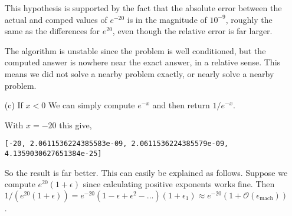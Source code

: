 \documentclass[10pt]{article}
\begin{document}
\begin{solution}[Solution]
\begin{enumerate}
        This hypothesis is supported by the fact that the absolute error between the actual and comped values of \( e^{-20} \) is in the magnitude of \( 10^{-9} \), roughly the same as the differences for \( e^{20} \), even though the relative error is far larger.

        The algorithm is unstable since the problem is well conditioned, but the computed answer is nowhere near the exact answer, in a relative sense. This means we did not solve a nearby problem exactly, or nearly solve a nearby problem. 
        


    \item[(c)]
        If \( x<0 \) We can simply compute \( e^{-x} \) and then return \( 1/e^{-x} \).

        With \( x=-20 \) this give,
        \begin{lstlisting}[basicstyle=\ttfamily\small]
[-20, 2.0611536224385583e-09, 2.0611536224385579e-09, 4.1359030627651384e-25]
        \end{lstlisting}

        So the result is far better. This can easily be explained as follows. Suppose we compute \( e^{20}(1+\epsilon) \) since calculating positive exponents works fine. Then \( 1/(e^{20}(1+\epsilon)) = e^{-20}(1-\epsilon+\epsilon^2-...)(1+\epsilon_1) \approx e^{-20}(1+\mathcal{O}(\epsilon_{\text{mach}})) \). 

\end{enumerate}
\end{solution}
\end{document}
